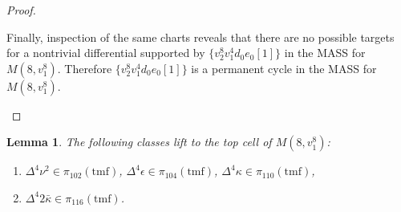 \documentclass[10pt]{amsart}
\newcommand{\tmf}{\mathrm{tmf}}
\newtheorem{lem}[equation]{Lemma}
\theoremstyle{definition}
\numberwithin{equation}{section}
\numberwithin{figure}{section}
\begin{document}
\begin{proof}
\begin{enumerate}
Finally, inspection of the same charts reveals that there are no possible targets for a nontrivial differential supported by $\{v_2^{8} v_1^4 d_0 e_0[1]\}$ in the MASS for $M(8,v_1^8)$. Therefore $\{v_2^{8} v_1^4 d_0 e_0[1]\}$ is a permanent cycle in the MASS for $M(8,v_1^8)$. 

\end{enumerate}

\end{proof}


\begin{lem}\label{Lem:v216neLift}
The following classes lift to the top cell of $M(8,v_1^8)$:
\begin{enumerate}
\item $\Delta^4 \nu^2 \in \pi_{102}(\tmf)$, $\Delta^4 \epsilon \in \pi_{104}(\tmf)$, $\Delta^4 \kappa \in \pi_{110}(\tmf)$, 
\item $\Delta^4 2 \bar{\kappa} \in \pi_{116}(\tmf)$. 

\end{enumerate}
\end{lem}
\end{document}
